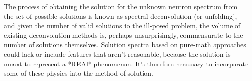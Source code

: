 The process of obtaining the solution for the unknown neutron spectrum from the set of possible solutions is known as spectral deconvolution (or unfolding), and given the number of valid solutions to the ill-posed problem, the volume of existing deconvolution methods is, perhaps unsurprisingly, commensurate to the number of solutions themselves.
Solution spectra based on pure-math approaches could lack or include features that aren't reasonable, because the solution is meant to represent a *REAl* phenomenon.
It's therefore necessary to incorporate some of these physics into the method of solution.





